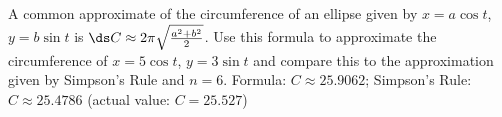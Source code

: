 {A common approximate of the circumference of an ellipse given by $x=a\cos t$,\quad $y=b\sin t$ is $\ds C\approx 2\pi\sqrt{\frac{a^2+b^2}2}$. Use this formula to approximate the circumference of $x=5\cos t$, \quad $y=3\sin t$ and compare this to the approximation given by  Simpson's Rule and $n=6$.}
{Formula: $C\approx 25.9062$; Simpson's Rule: $C\approx 25.4786$ (actual value: $C=25.527$) }
